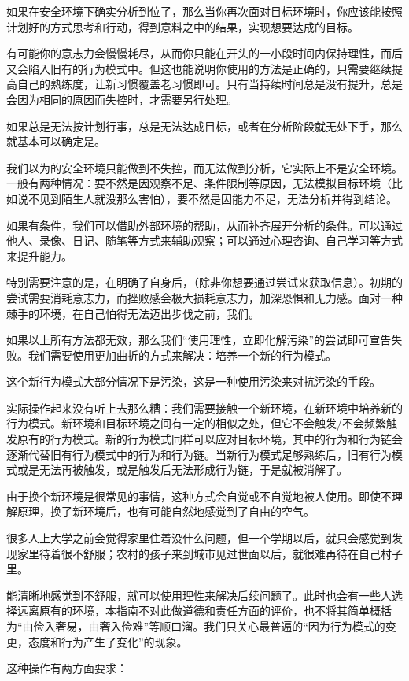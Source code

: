 如果在安全环境下确实分析到位了，那么当你再次面对目标环境时，你应该能按照计划好的方式思考和行动，得到意料之中的结果，实现想要达成的目标。
\begin{explain}
有可能你的意志力会慢慢耗尽，从而你只能在开头的一小段时间内保持理性，而后又会陷入旧有的行为模式中。但这也能说明你使用的方法是正确的，只需要继续提高自己的熟练度，让新习惯覆盖老习惯即可。只有当持续时间总是没有提升，总是会因为相同的原因而失控时，才需要另行处理。
\end{explain}
如果总是无法按计划行事，总是无法达成目标，或者在分析阶段就无处下手，那么就基本可以确定是。
\begin{explain}
我们以为的安全环境只能做到不失控，而无法做到分析，它实际上不是安全环境。一般有两种情况：要不然是因观察不足、条件限制等原因，无法模拟目标环境（比如说不见到陌生人就没那么害怕），要不然是因能力不足，无法分析并得到结论。

如果有条件，我们可以借助外部环境的帮助，从而补齐展开分析的条件。可以通过他人、录像、日记、随笔等方式来辅助观察；可以通过心理咨询、自己学习等方式来提升能力。

特别需要注意的是，在明确了自身后，（除非你想要通过尝试来获取信息）。初期的尝试需要消耗意志力，而挫败感会极大损耗意志力，加深恐惧和无力感。面对一种棘手的环境，在自己怕得无法迈出步伐之前，我们。
\end{explain}
如果以上所有方法都无效，那么我们“使用理性，立即化解污染”的尝试即可宣告失败。我们需要使用更加曲折的方式来解决：培养一个新的行为模式。
\begin{explain}
这个新行为模式大部分情况下是污染，这是一种使用污染来对抗污染的手段。
\end{explain}
实际操作起来没有听上去那么糟：我们需要接触一个新环境，在新环境中培养新的行为模式。新环境和目标环境之间有一定的相似之处，但它不会触发/不会频繁触发原有的行为模式。新的行为模式同样可以应对目标环境，其中的行为和行为链会逐渐代替旧有行为模式中的行为和行为链。当新行为模式足够熟练后，旧有行为模式或是无法再被触发，或是触发后无法形成行为链，于是就被消解了。
\begin{examples}
由于换个新环境是很常见的事情，这种方式会自觉或不自觉地被人使用。即使不理解原理，换了新环境后，也有可能自然地感觉到了自由的空气。

很多人上大学之前会觉得家里住着没什么问题，但一个学期以后，就只会感觉到发现家里待着很不舒服；农村的孩子来到城市见过世面以后，就很难再待在自己村子里。

能清晰地感觉到不舒服，就可以使用理性来解决后续问题了。此时也会有一些人选择远离原有的环境，本指南不对此做道德和责任方面的评价，也不将其简单概括为“由俭入奢易，由奢入俭难”等顺口溜。我们只关心最普遍的“因为行为模式的变更，态度和行为产生了变化”的现象。
\end{examples}
这种操作有两方面要求：

